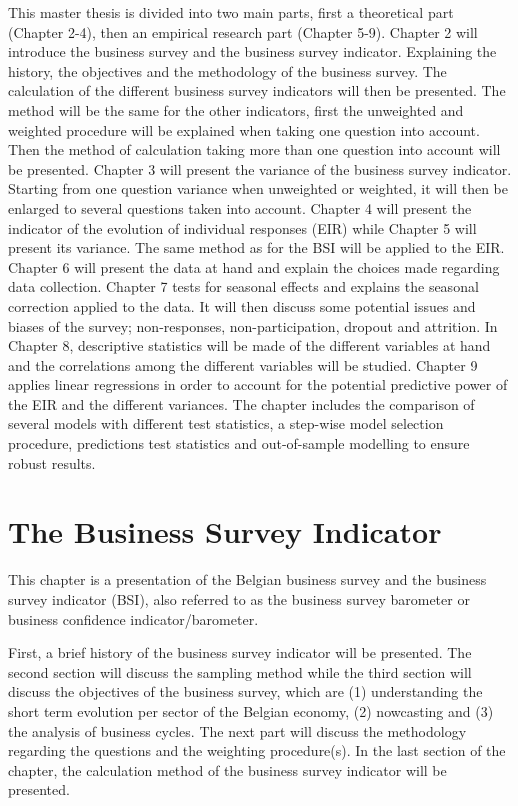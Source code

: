 \documentclass[12pt,a4paper,oneside]{book}
\begin{document}
This master thesis is divided into two main parts, first a theoretical part (Chapter 2-4), then an empirical research part (Chapter 5-9).
Chapter 2 will introduce the business survey and the business survey indicator. Explaining the history, the objectives and the methodology of the business survey. The calculation of the different business survey indicators will then be presented. The method will be the same for the other indicators, first the unweighted and weighted procedure will be explained when taking one question into account. Then the method of calculation taking more than one question into account will be presented.
Chapter 3 will present the variance of the business survey indicator. Starting from one question variance when unweighted or weighted, it will then be enlarged to several questions taken into account.
Chapter 4 will present the indicator of the evolution of individual responses (EIR) while Chapter 5 will present its variance. The same method as for the BSI will be applied to the EIR.
Chapter 6 will present the data at hand and explain the choices made regarding data collection.
Chapter 7 tests for seasonal effects and explains the seasonal correction applied to the data. It will then discuss some potential issues and biases of the survey; non-responses, non-participation, dropout and attrition.
In Chapter 8, descriptive statistics will be made of the different variables at hand and the correlations among the different variables will be studied.
Chapter 9 applies linear regressions in order to account for the potential predictive power of the EIR and the different variances. 
The chapter includes the comparison of several models with different test statistics, a step-wise model selection procedure, predictions test statistics and out-of-sample modelling to ensure robust results.


\chapter{The Business Survey Indicator}

This chapter is a presentation of the Belgian business survey and the business survey indicator (BSI), also referred to as the business survey barometer or business confidence indicator/barometer.

First, a brief history of the business survey indicator will be presented.
The second section will discuss the sampling method while the third section will discuss the objectives of the business survey, which are (1) understanding the short term evolution per sector of the Belgian economy, (2) nowcasting and (3) the analysis of business cycles.
The next part will discuss the methodology regarding the questions and the weighting procedure(s).
In the last section of the chapter, the calculation method of the business survey indicator will be presented.
\end{document}
